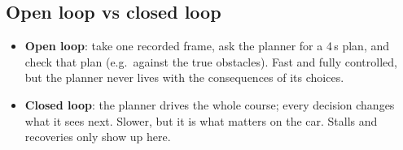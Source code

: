 \documentclass[11pt,a4paper]{article}
\newcommand{\term}[1]{\textbf{#1}}
\begin{document}
\subsection{Open loop vs closed loop}
\begin{itemize}[nosep]
  \item \term{Open loop}: take one recorded frame, ask the planner for a 4\,s plan, and check that plan
        (e.g.\ against the true obstacles). Fast and fully controlled, but the planner never lives with the
        consequences of its choices.
  \item \term{Closed loop}: the planner drives the whole course; every decision changes what it sees next.
        Slower, but it is what matters on the car. Stalls and recoveries only show up here.
\end{itemize}
\end{document}
